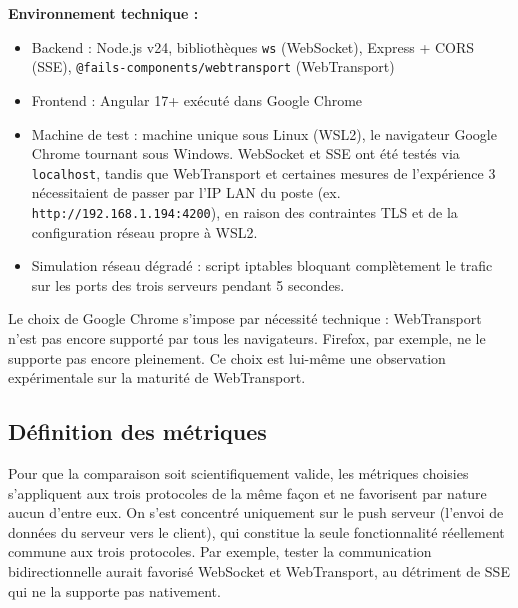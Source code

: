 \textbf{Environnement technique :}

\begin{itemize}
    \sloppy
    \item Backend : Node.js v24, bibliothèques \texttt{ws} (WebSocket), Express + CORS (SSE), \texttt{@fails-components/}\allowbreak\texttt{webtransport} (WebTransport)
    \item Frontend : Angular 17+ exécuté dans Google Chrome
    \item Machine de test : machine unique sous Linux (WSL2), le navigateur Google Chrome tournant sous Windows. WebSocket et SSE ont été testés via \texttt{localhost}, tandis que WebTransport et certaines mesures de l'expérience 3 nécessitaient de passer par l'IP LAN du poste (ex. \texttt{http://192.168.1.194:4200}), en raison des contraintes TLS et de la configuration réseau propre à WSL2.
    \item Simulation réseau dégradé : script iptables bloquant complètement le trafic sur les ports des trois serveurs pendant 5 secondes.
\end{itemize}

Le choix de Google Chrome s'impose par nécessité technique : WebTransport n'est pas encore supporté par tous les navigateurs. Firefox, par exemple, ne le supporte pas encore pleinement. Ce choix est lui-même une observation expérimentale sur la maturité de WebTransport.

\subsection{Définition des métriques}

Pour que la comparaison soit scientifiquement valide, les métriques choisies s'appliquent aux trois protocoles de la même façon et ne favorisent par nature aucun d'entre eux. On s'est concentré uniquement sur le push serveur (l'envoi de données du serveur vers le client), qui constitue la seule fonctionnalité réellement commune aux trois protocoles. Par exemple, tester la communication bidirectionnelle aurait favorisé WebSocket et WebTransport, au détriment de SSE qui ne la supporte pas nativement.

